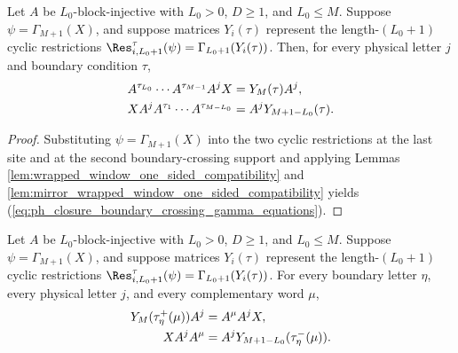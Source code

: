 \begin{lemma}%
    \label{lem:closure_property_boundary_crossing_equations_ground_space_map}
    \leanok
    Let $A$ be $L_0$-block-injective with $L_0>0$, $D\ge1$, and $L_0\le M$.
    Suppose $\psi=\Gamma_{M+1}(X)$, and suppose matrices $Y_i(\tau)$ represent
    the length-$(L_0+1)$ cyclic restrictions
    $\Res^\tau_{i,L_0+1}(\psi)=\Gamma_{L_0+1}(Y_i(\tau))$. Then, for every
    physical letter $j$ and boundary condition $\tau$,
    \begin{align}
        A^{\tau_{L_0}}\cdots A^{\tau_{M-1}}A^jX
         & =Y_M(\tau)A^j,
        \label{eq:ph_closure_boundary_crossing_gamma_equations} \\
        X A^j A^{\tau_1}\cdots A^{\tau_{M-L_0}}
         & =A^jY_{M+1-L_0}(\tau). \notag
    \end{align}
\end{lemma}

\begin{proof}
    \leanok
    Substituting $\psi=\Gamma_{M+1}(X)$ into the two cyclic restrictions at the
    last site and at the second boundary-crossing support and applying Lemmas
    \ref{lem:wrapped_window_one_sided_compatibility} and
    \ref{lem:mirror_wrapped_window_one_sided_compatibility} yields
    (\ref{eq:ph_closure_boundary_crossing_gamma_equations}).
\end{proof}

\begin{lemma}
    \label{lem:closure_property_boundary_one_sided_products_ground_space_map}
    \leanok
    Let $A$ be $L_0$-block-injective with $L_0>0$, $D\ge1$, and $L_0\le M$.
    Suppose $\psi=\Gamma_{M+1}(X)$, and suppose matrices $Y_i(\tau)$ represent
    the length-$(L_0+1)$ cyclic restrictions
    $\Res^\tau_{i,L_0+1}(\psi)=\Gamma_{L_0+1}(Y_i(\tau))$. For every boundary
    letter $\eta$, every physical letter $j$, and every complementary word
    $\mu$,
    \begin{align}
        Y_M(\tau^+_\eta(\mu))A^j & = A^\mu A^jX, \notag                       \\
        X A^jA^\mu               & = A^jY_{M+1-L_0}(\tau^-_\eta(\mu)). \notag
    \end{align}
\end{lemma}

